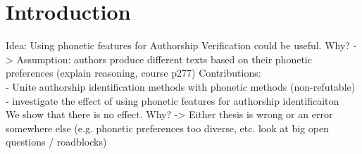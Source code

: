 \chapter{Introduction}\label{introduction}
Idea: Using phonetic features for Authorship Verification could be useful.
Why?
-> Assumption: authors produce different texts based on their phonetic preferences (explain reasoning, course p277)
Contributions:\\
- Unite authorship identification methods with phonetic methods (non-refutable)\\
- investigate the effect of using phonetic features for authorship identificaiton\\

We show that there is no effect.
Why?
-> Either thesis is wrong or an error somewhere else (e.g. phonetic preferences too diverse, etc. look at big open questions / roadblocks)










